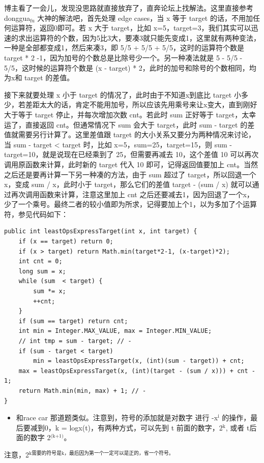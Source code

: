 \documentclass[9pt, b5paaper]{book}
\begin{document}
博主看了一会儿，发现没思路就直接放弃了，直奔论坛上找解法。这里直接参考 donggua$_{\text{fu}}$ 大神的解法吧，首先处理 edge cases，当 x 等于 target 的话，不用加任何运算符，返回0即可。若 x 大于 target，比如 x=5，target=3，我们其实可以迅速的求出运算符的个数，因为5比3大，要凑3就只能先变成1，这里就有两种变法，一种是全部都变成1，然后来凑3，即 5/5 + 5/5 + 5/5，这时的运算符个数是 target * 2 -1，因为加号的个数总是比除号少一个。另一种凑法就是 5 - 5/5 - 5/5，这时候的运算符个数是 (x - target) * 2，此时的加号和除号的个数相同，均为x和 target 的差值。

接下来就要处理 x 小于 target 的情况了，此时由于不知道x到底比 target 小多少，若差距太大的话，肯定不能用加号，所以应该先用乘号来让x变大，直到刚好大于等于 target 停止，并每次增加次数 cnt。若此时 sum 正好等于 target，太幸运了，直接返回 cnt。但通常情况下 sum 会大于 target，此时 sum - target 的差值就需要另行计算了。这里差值跟 target 的大小关系又要分为两种情况来讨论，当 sum - target < target 时，比如 x=5，sum=25，target=15，则 sum - target=10，就是说现在已经乘到了 25，但需要再减去 10，这个差值 10 可以再次调用原函数来计算，此时新的 target 代入 10 即可，记得返回值要加上 cnt。当然之后还是要再计算一下另一种凑的方法，由于 sum 超过了 target，所以回退一个x，变成 sum / x，此时小于 target，那么它们的差值 target - (sum / x) 就可以通过再次调用函数来计算，注意这里加上 cnt 之后还要减去1，因为回退了一个x，少了一个乘号。最终二者的较小值即为所求，记得要加上个1，以为多加了个运算符，参见代码如下：

\begin{verbatim}
public int leastOpsExpressTarget(int x, int target) {
    if (x == target) return 0;
    if (x > target) return Math.min(target*2-1, (x-target)*2);
    int cnt = 0;
    long sum = x;
    while (sum  < target) {
        sum *= x;
        ++cnt;
    }
    if (sum == target) return cnt;
    int min = Integer.MAX_VALUE, max = Integer.MIN_VALUE;
    // int tmp = sum - target; // -
    if (sum - target < target)
        min = leastOpsExpressTarget(x, (int)(sum - target)) + cnt;
    max = leastOpsExpressTarget(x, (int)(target - (sum / x))) + cnt - 1;
    return Math.min(min, max) + 1; // -
}
\end{verbatim}
\begin{itemize}
\item 和race car 那道题类似。注意到，符号的添加就是对数字 进行 -x$^{\text{i}}$ 的操作，最后要减到0，k = logx(t)，有两种方式，可以先到 t 前面的数字，2$^{\text{k}}$, 或者 t后面的数字 2$^{\text{(k+1)}}$。
\end{itemize}
注意，2$^{\text{k需要的符号是k，最后因为第一个一定可以是正的，省一个符号。}}$
\end{document}
